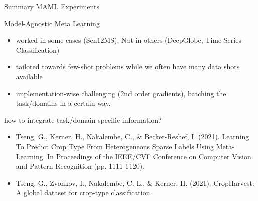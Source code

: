 \documentclass[11pt]{beamer}
\newcommand{\citeapa}[1]{ {\tiny#1\par} }
\begin{document}
	\begin{frame}{Summary MAML Experiments}
		
				Model-Agnostic Meta Learning
				\begin{itemize}
					\item worked in some cases (Sen12MS). Not in others (DeepGlobe, Time Series Classification)
					\item tailored towards few-shot problems while we often have many data shots available 
					\item implementation-wise challenging (2nd order gradients), batching the task/domains in a certain way.
				\end{itemize}

		\vspace{1em}
		
		how to integrate task/domain specific information?
		\begin{itemize}
			\item \citeapa{Tseng, G., Kerner, H., Nakalembe, C., \& Becker-Reshef, I. (2021). Learning To Predict Crop Type From Heterogeneous Sparse Labels Using Meta-Learning. In Proceedings of the IEEE/CVF Conference on Computer Vision and Pattern Recognition (pp. 1111-1120).}
			\item \citeapa{Tseng, G., Zvonkov, I., Nakalembe, C. L., \& Kerner, H. (2021). CropHarvest: A global dataset for crop-type classification.}
		\end{itemize}
	


	\end{frame}
\end{document}
